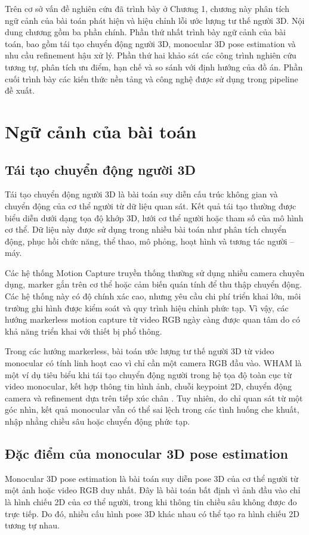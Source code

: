 \documentclass[../DoAn.tex]{subfiles}
\begin{document}
Trên cơ sở vấn đề nghiên cứu đã trình bày ở Chương 1, chương này phân tích ngữ cảnh của bài toán phát hiện và hiệu chỉnh lỗi ước lượng tư thế người 3D. Nội dung chương gồm ba phần chính. Phần thứ nhất trình bày ngữ cảnh của bài toán, bao gồm tái tạo chuyển động người 3D, monocular 3D pose estimation và nhu cầu refinement hậu xử lý. Phần thứ hai khảo sát các công trình nghiên cứu tương tự, phân tích ưu điểm, hạn chế và so sánh với định hướng của đồ án. Phần cuối trình bày các kiến thức nền tảng và công nghệ được sử dụng trong pipeline đề xuất.

\section{Ngữ cảnh của bài toán}
\label{sec:context}

\subsection{Tái tạo chuyển động người 3D}
Tái tạo chuyển động người 3D là bài toán suy diễn cấu trúc không gian và chuyển động của cơ thể người từ dữ liệu quan sát. Kết quả tái tạo thường được biểu diễn dưới dạng tọa độ khớp 3D, lưới cơ thể người hoặc tham số của mô hình cơ thể. Dữ liệu này được sử dụng trong nhiều bài toán như phân tích chuyển động, phục hồi chức năng, thể thao, mô phỏng, hoạt hình và tương tác người -- máy.

Các hệ thống Motion Capture truyền thống thường sử dụng nhiều camera chuyên dụng, marker gắn trên cơ thể hoặc cảm biến quán tính để thu thập chuyển động. Các hệ thống này có độ chính xác cao, nhưng yêu cầu chi phí triển khai lớn, môi trường ghi hình được kiểm soát và quy trình hiệu chỉnh phức tạp. Vì vậy, các hướng markerless motion capture từ video RGB ngày càng được quan tâm do có khả năng triển khai với thiết bị phổ thông.

Trong các hướng markerless, bài toán ước lượng tư thế người 3D từ video monocular có tính linh hoạt cao vì chỉ cần một camera RGB đầu vào. WHAM là một ví dụ tiêu biểu khi tái tạo chuyển động người trong hệ tọa độ toàn cục từ video monocular, kết hợp thông tin hình ảnh, chuỗi keypoint 2D, chuyển động camera và refinement dựa trên tiếp xúc chân \cite{shin2024wham}. Tuy nhiên, do chỉ quan sát từ một góc nhìn, kết quả monocular vẫn có thể sai lệch trong các tình huống che khuất, nhập nhằng chiều sâu hoặc chuyển động phức tạp.

\subsection{Đặc điểm của monocular 3D pose estimation}
Monocular 3D pose estimation là bài toán suy diễn pose 3D của cơ thể người từ một ảnh hoặc video RGB duy nhất. Đây là bài toán bất định vì ảnh đầu vào chỉ là hình chiếu 2D của cơ thể người, trong khi thông tin chiều sâu không được đo trực tiếp. Do đó, nhiều cấu hình pose 3D khác nhau có thể tạo ra hình chiếu 2D tương tự nhau.
\end{document}

